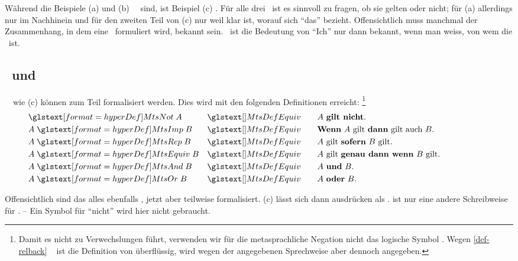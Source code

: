 Während die Beispiele (a) und (b) \atomare\ \Aussagen\ sind, ist Beispiel (c) \zerlegbar.
Für alle drei \Aussagen\ ist es sinnvoll zu fragen, ob sie gelten oder nicht;
für (a) allerdings nur im Nachhinein und für den zweiten Teil von (c) nur weil klar ist, worauf sich "`das"' bezieht.
Offensichtlich muss manchmal der Zusammenhang, in dem eine \Aussage\ formuliert wird, bekannt sein.
\textZB\ ist die Bedeutung von "`Ich"' nur dann bekannt, wenn man weiss, von wem die \Aussage\ ist.

\subsection[Aussagen und Metaoperationen]{\Aussagen\ und \Metaoperationen}%
\label  {sub-AussagenUndMetaoperationen}

\Zerlegbare\ \Aussagen\ wie (c) können zum Teil formalisiert werden.
Dies wird mit den folgenden Definitionen erreicht:%
\footnote{%
	Damit es nicht zu Verwechslungen führt, verwenden wir für die metasprachliche Negation nicht das logische Symbol \chrqt{\OjkNot}.
	Wegen \eqref{def-relback} \pagename~\pageref{def-relback} ist die Definition von \chrqt{\MtsRep} überflüssig, wird wegen der angegebenen Sprechweise aber dennoch angegeben.
}
\begin{align}
	&    \defSymUna{\MtsNot}   A & \MtsDefEquiv \qquad &
	\text{$A$ \defFt{gilt nicht}.}
	\\
	& A \defSymBin{\MtsImp}   B & \MtsDefEquiv \qquad &
	\text{\defFt{Wenn} $A$ gilt \defFt{dann} gilt auch $B$.}
	\\
	& A \defSymBin{\MtsRep}   B & \MtsDefEquiv \qquad &
	\text{$A$ gilt \defFt{sofern} $B$ gilt.}
	\\
	& A \defSymBin{\MtsEquiv} B & \MtsDefEquiv \qquad &
	\text{$A$ gilt \defFt{genau dann wenn} $B$ gilt.}
	\\
	& A \defSymBin{\MtsAnd}   B & \MtsDefEquiv \qquad &
	\text{$A$ \defFt{und}  $B$.}
	\\
	& A \defSymBin{\MtsOr}    B & \MtsDefEquiv \qquad &
	\text{$A$ \defFt{oder} $B$.}
	\formulatoleft
\end{align}

Offensichtlich sind das alles ebenfalls \Aussagen, jetzt aber teilweise formalisiert.
(c) lässt sich dann ausdrücken als .
 ist nur eine andere Schreibweise für .
-- Ein Symbol für "`nicht"' wird hier nicht gebraucht.

